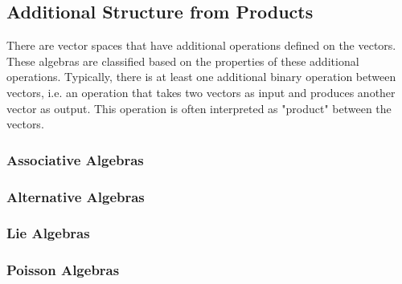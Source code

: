 


\subsection{Additional Structure from Products} 
There are vector spaces that have additional operations defined on the vectors. These algebras are classified based on the properties of these additional operations. Typically, there is at least one additional binary operation between vectors, i.e. an operation that takes two vectors as input and produces another vector as output. This operation is often interpreted as "product" between the vectors.


\subsubsection{Associative Algebras} 

\subsubsection{Alternative Algebras} 

\subsubsection{Lie Algebras} 



\subsubsection{Poisson Algebras} 


